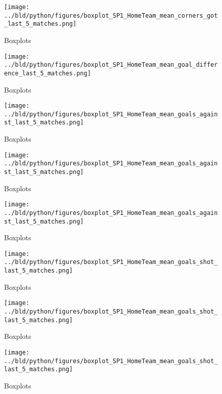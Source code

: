 \documentclass[11pt, a4paper, leqno]{article}
\begin{document}
\begin{figure}[H]
    \centering
    \texttt{[image: ../bld/python/figures/boxplot\_SP1\_HomeTeam\_mean\_corners\_got\_last\_5\_matches.png]}
    \caption{Boxplots}
    \label{fig:figure2}
\end{figure}

\begin{figure}[H]
    \centering
    \texttt{[image: ../bld/python/figures/boxplot\_SP1\_HomeTeam\_mean\_goal\_difference\_last\_5\_matches.png]}
    \caption{Boxplots}
    \label{fig:figure2}
\end{figure}


\begin{figure}[H]
    \centering
    \texttt{[image: ../bld/python/figures/boxplot\_SP1\_HomeTeam\_mean\_goals\_against\_last\_5\_matches.png]}
    \caption{Boxplots}
    \label{fig:figure2}
\end{figure}

\begin{figure}[H]
    \centering
    \texttt{[image: ../bld/python/figures/boxplot\_SP1\_HomeTeam\_mean\_goals\_against\_last\_5\_matches.png]}
    \caption{Boxplots}
    \label{fig:figure2}
\end{figure}

\begin{figure}[H]
    \centering
    \texttt{[image: ../bld/python/figures/boxplot\_SP1\_HomeTeam\_mean\_goals\_against\_last\_5\_matches.png]}
    \caption{Boxplots}
    \label{fig:figure2}
\end{figure}


\begin{figure}[H]
    \centering
    \texttt{[image: ../bld/python/figures/boxplot\_SP1\_HomeTeam\_mean\_goals\_shot\_last\_5\_matches.png]}
    \caption{Boxplots}
    \label{fig:figure2}
\end{figure}

\begin{figure}[H]
    \centering
    \texttt{[image: ../bld/python/figures/boxplot\_SP1\_HomeTeam\_mean\_goals\_shot\_last\_5\_matches.png]}
    \caption{Boxplots}
    \label{fig:figure2}
\end{figure}

\begin{figure}[H]
    \centering
    \texttt{[image: ../bld/python/figures/boxplot\_SP1\_HomeTeam\_mean\_goals\_shot\_last\_5\_matches.png]}
    \caption{Boxplots}
    \label{fig:figure2}
\end{figure}
\end{document}
